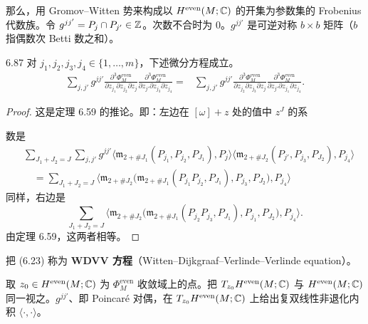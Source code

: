 那么，用 Gromov–Witten 势来构成以 $H^{\mathrm{even}}(M;\mathbb{C})$ 的开集为参数集的 Frobenius 代数族。令 $g^{jj'}=P_j\cap P_{j'}\in\mathbb{Z}$。次数不合时为 $0$。$g^{jj'}$ 是可逆对称 $b\times b$ 矩阵（$b$ 指偶数次 Betti 数之和）。

\begin{theorem*}{6.87}
  对 $j_1,j_2,j_3,j_4\in\{1,\dots,m\}$，下述微分方程成立。
  \begin{equation}
  \begin{aligned}
    \sum_{j,j'}g^{jj'}
    \frac{\partial^3\Phi_M^{\mathrm{even}}}{\partial z_{j_1}\partial z_{j_2}\partial z_j}
    \frac{\partial^3\Phi_M^{\mathrm{even}}}{\partial z_{j'}\partial z_{j_3}\partial z_{j_4}}
    ={}&\sum_{j,j'}g^{jj'}
    \frac{\partial^3\Phi_M^{\mathrm{even}}}{\partial z_{j_2}\partial z_{j_3}\partial z_j}
    \frac{\partial^3\Phi_M^{\mathrm{even}}}{\partial z_{j'}\partial z_{j_1}\partial z_{j_4}} .
  \end{aligned}
  \tag{6.23}
  \end{equation}
\end{theorem*}

\begin{proof}
  这是定理 6.59 的推论。即：左边在 $[\omega]+z$ 处的值中 $z^J$ 的系

  数是
  \[
  \begin{aligned}
    &\sum_{J_1+J_2=J}\sum_{j,j'}g^{jj'}
    \big\langle\mathfrak{m}_{2+\#J_1}(P_{j_1},P_{j_2},P_{J_1}),P_j\big\rangle
    \big\langle\mathfrak{m}_{2+\#J_2}(P_{j'},P_{j_3},P_{J_2}),P_{j_4}\big\rangle\\
    &\quad=\sum_{J_1+J_2=J}
    \Big\langle\mathfrak{m}_{2+\#J_2}\big(\mathfrak{m}_{2+\#J_1}(P_{j_1}P_{j_2},P_{J_1}),P_{j_3},P_{J_2}\big),P_{j_4}\Big\rangle
  \end{aligned}
  \]
  同样，右边是
  \[
    \sum_{J_1+J_2=J}
    \Big\langle\mathfrak{m}_{2+\#J_2}\big(\mathfrak{m}_{2+\#J_1}(P_{j_2}P_{j_3},P_{J_1}),P_{j_1},P_{J_2}\big),P_{j_4}\Big\rangle .
  \]
  由定理 6.59，这两者相等。
\end{proof}

把 (6.23) 称为 \textbf{WDVV 方程}（Witten–Dijkgraaf–Verlinde–Verlinde equation）。


取 $z_0\in H^{\mathrm{even}}(M;\mathbb{C})$ 为 $\Phi_M^{\mathrm{even}}$ 收敛域上的点。把 $T_{z_0}H^{\mathrm{even}}(M;\mathbb{C})$ 与 $H^{\mathrm{even}}(M;\mathbb{C})$ 同一视之。$g^{jj'}$、即 Poincaré 对偶，在 $T_{z_0}H^{\mathrm{even}}(M;\mathbb{C})$ 上给出复双线性非退化内积 $\langle\cdot,\cdot\rangle$。

